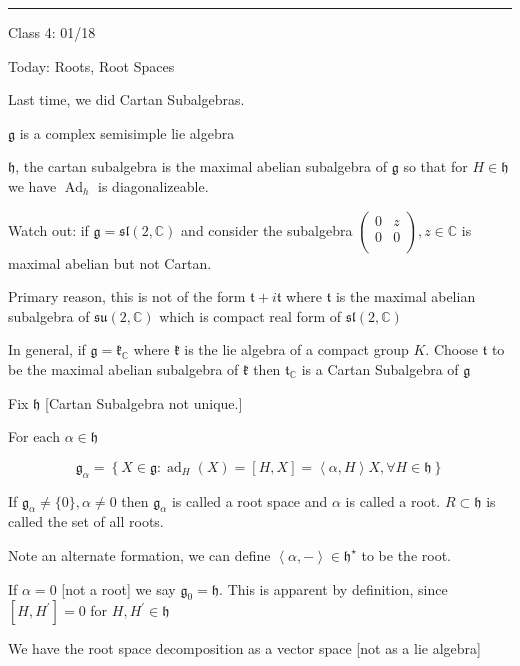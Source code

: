 \documentclass{article}
\theoremstyle{definition}
\begin{document}
\hrule
\hfil

Class 4: 01/18

Today: Roots, Root Spaces

Last time, we did Cartan Subalgebras.

\(\mathfrak{g} \) is a complex semisimple lie algebra

\(\mathfrak{h} \), the cartan subalgebra is the maximal abelian subalgebra of \(\mathfrak{g} \) so that for \(H\in \mathfrak{h} \) we have \(\operatorname{Ad}_h\) is diagonalizeable.

Watch out: if \(\mathfrak{g} =\mathfrak{sl} (2,\mathbb{C} )\) and consider the subalgebra \(\begin{pmatrix}
    0 &  z \\
    0 &  0 \\
\end{pmatrix},z\in\mathbb{C} \) is maximal abelian but not Cartan.

Primary reason, this is not of the form \(\mathfrak{t}+i\mathfrak{t} \) where \(\mathfrak{t} \) is the maximal abelian subalgebra of \(\mathfrak{su} (2,\mathbb{C} )\) which is compact real form of \(\mathfrak{sl}(2,\mathbb{C}) \) 

In general, if \(\mathfrak{g}=\mathfrak{k}_\mathbb{C}    \) where \(\mathfrak{k} \) is the lie algebra of a compact group \(K\). Choose \(\mathfrak{t} \) to be the maximal abelian subalgebra of \(\mathfrak{k} \) then \(\mathfrak{t}_\mathbb{C} \) is a Cartan Subalgebra of \(\mathfrak{g} \)

Fix \(\mathfrak{h} \) [Cartan Subalgebra not unique.]

For each \(\alpha \in \mathfrak{h}\)

\[
    \mathfrak{g}_\alpha = \left\{ X\in \mathfrak{g} : \operatorname{ad}_H(X)=[H,X]=\left\langle \alpha ,H \right\rangle X, \forall H\in \mathfrak{h}   \right\}  
\]

If \(\mathfrak{g}_\alpha \neq \{0\},\alpha \neq 0 \) then \(\mathfrak{g}_\alpha  \) is called a root space and \(\alpha \) is called a root. \(R \subset \mathfrak{h} \) is called the set of all roots.

Note an alternate formation, we can define \(\left\langle \alpha , - \right\rangle \in \mathfrak{h}^{\star} \) to be the root.

If \(\alpha =0\) [not a root] we say \(\mathfrak{g}_0=\mathfrak{h}  \). This is apparent by definition, since \([H,H^{\prime} ]=0\) for \(H,H^{\prime} \in \mathfrak{h} \)  

We have the root space decomposition as a vector space [not as a lie algebra]
\end{document}
